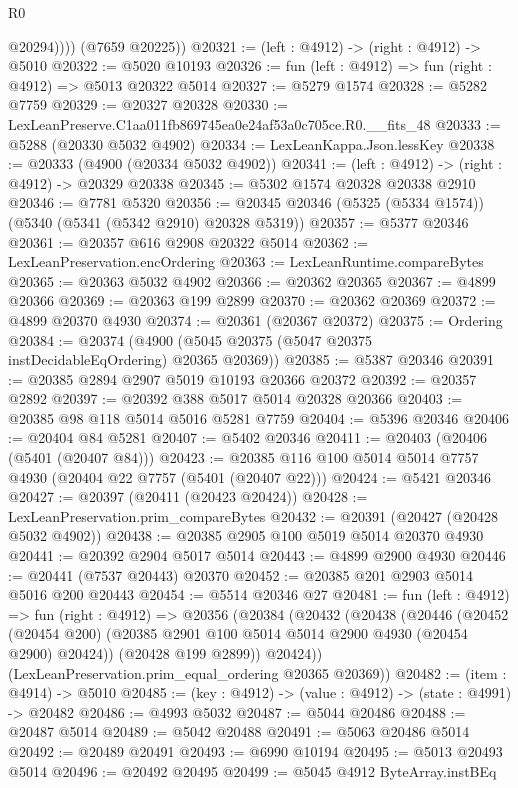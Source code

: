 \begin{lexlean}{R0}
\begin{coremodule}
              @20294))))
      (@7659 @20225))
@20321 := (left : @4912) -> (right : @4912) -> @5010
@20322 := @5020 @10193
@20326 := fun (left : @4912) => fun (right : @4912) => @5013 @20322 @5014
@20327 := @5279 @1574
@20328 := @5282 @7759
@20329 := @20327 @20328
@20330 := LexLeanPreserve.C1aa011fb869745ea0e24af53a0c705ce.R0.__fits_48
@20333 := @5288 (@20330 @5032 @4902)
@20334 := LexLeanKappa.Json.lessKey
@20338 := @20333 (@4900 (@20334 @5032 @4902))
@20341 := (left : @4912) -> (right : @4912) -> @20329 @20338
@20345 := @5302 @1574 @20328 @20338 @2910
@20346 := @7781 @5320
@20356 := @20345 @20346 (@5325 (@5334 @1574)) (@5340 (@5341 (@5342 @2910) @20328 @5319))
@20357 := @5377 @20346
@20361 := @20357 @616 @2908 @20322 @5014
@20362 := LexLeanPreservation.encOrdering
@20363 := LexLeanRuntime.compareBytes
@20365 := @20363 @5032 @4902
@20366 := @20362 @20365
@20367 := @4899 @20366
@20369 := @20363 @199 @2899
@20370 := @20362 @20369
@20372 := @4899 @20370 @4930
@20374 := @20361 (@20367 @20372)
@20375 := Ordering
@20384 := @20374 (@4900 (@5045 @20375 (@5047 @20375 instDecidableEqOrdering) @20365 @20369))
@20385 := @5387 @20346
@20391 := @20385 @2894 @2907 @5019 @10193 @20366 @20372
@20392 := @20357 @2892
@20397 := @20392 @388 @5017 @5014 @20328 @20366
@20403 := @20385 @98 @118 @5014 @5016 @5281 @7759
@20404 := @5396 @20346
@20406 := @20404 @84 @5281
@20407 := @5402 @20346
@20411 := @20403 (@20406 (@5401 (@20407 @84)))
@20423 := @20385 @116 @100 @5014 @5014 @7757 @4930 (@20404 @22 @7757 (@5401 (@20407 @22)))
@20424 := @5421 @20346
@20427 := @20397 (@20411 (@20423 @20424))
@20428 := LexLeanPreservation.prim_compareBytes
@20432 := @20391 (@20427 (@20428 @5032 @4902))
@20438 := @20385 @2905 @100 @5019 @5014 @20370 @4930
@20441 := @20392 @2904 @5017 @5014
@20443 := @4899 @2900 @4930
@20446 := @20441 (@7537 @20443) @20370
@20452 := @20385 @201 @2903 @5014 @5016 @200 @20443
@20454 := @5514 @20346 @27
@20481 := fun (left : @4912) =>
  fun (right : @4912) =>
  @20356
    (@20384
      (@20432
        (@20438
          (@20446
            (@20452 (@20454 @200) (@20385 @2901 @100 @5014 @5014 @2900 @4930 (@20454 @2900) @20424))
            (@20428 @199 @2899))
          @20424))
      (LexLeanPreservation.prim_equal_ordering @20365 @20369))
@20482 := (item : @4914) -> @5010
@20485 := (key : @4912) -> (value : @4912) -> (state : @4991) -> @20482
@20486 := @4993 @5032
@20487 := @5044 @20486
@20488 := @20487 @5014
@20489 := @5042 @20488
@20491 := @5063 @20486 @5014
@20492 := @20489 @20491
@20493 := @6990 @10194
@20495 := @5013 @20493 @5014
@20496 := @20492 @20495
@20499 := @5045 @4912 ByteArray.instBEq

\end{coremodule}
\end{lexlean}
